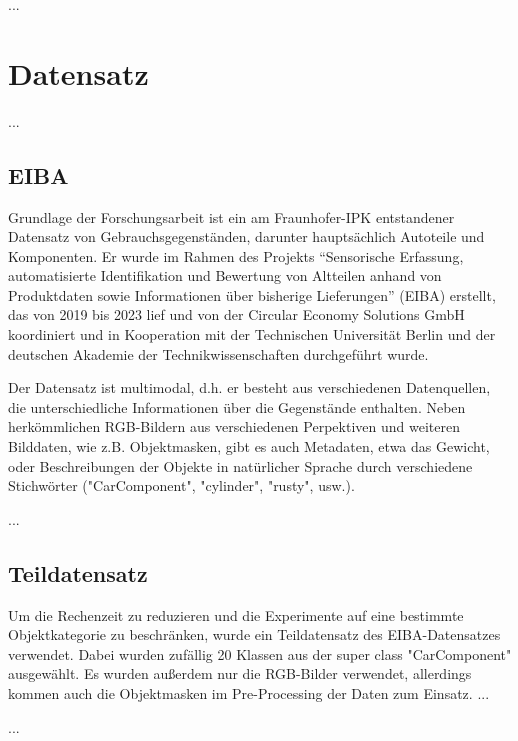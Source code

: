 ...

\section{Datensatz}

... %

\subsection{EIBA}

Grundlage der Forschungsarbeit ist ein am Fraunhofer-IPK entstandener Datensatz von Gebrauchsgegenständen, darunter hauptsächlich Autoteile und Komponenten. Er wurde im Rahmen des Projekts “Sensorische Erfassung, automatisierte Identifikation und Bewertung von Altteilen anhand von Produktdaten sowie Informationen über bisherige Lieferungen” (EIBA) erstellt, das von 2019 bis 2023 lief und von der Circular Economy Solutions GmbH koordiniert und in Kooperation mit der Technischen Universität Berlin und der deutschen Akademie der Technikwissenschaften durchgeführt wurde. \cite{}

Der Datensatz ist multimodal, d.h. er besteht aus verschiedenen Datenquellen, die unterschiedliche Informationen über die Gegenstände enthalten. Neben herkömmlichen RGB-Bildern aus verschiedenen Perpektiven und weiteren Bilddaten, wie z.B. Objektmasken, gibt es auch Metadaten, etwa das Gewicht, oder Beschreibungen der Objekte in natürlicher Sprache durch verschiedene Stichwörter ("CarComponent", "cylinder", "rusty", usw.).

...

\subsection{Teildatensatz}

Um die Rechenzeit zu reduzieren und die Experimente auf eine bestimmte Objektkategorie zu beschränken, wurde ein Teildatensatz des EIBA-Datensatzes verwendet. Dabei wurden zufällig 20 Klassen aus der super class "CarComponent" ausgewählt. Es wurden außerdem nur die RGB-Bilder verwendet, allerdings kommen auch die Objektmasken im Pre-Processing der Daten zum Einsatz. ...

...


